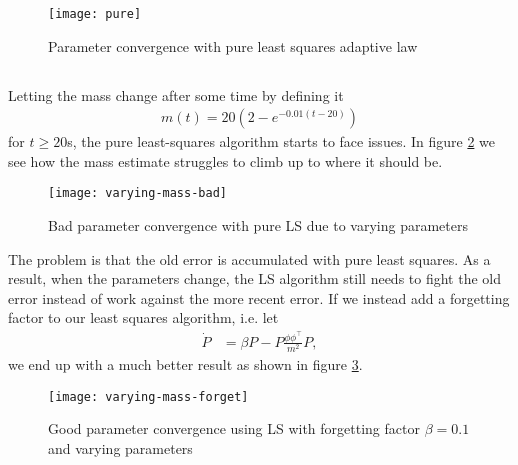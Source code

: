 \documentclass[]{article}
\begin{document}
\begin{figure}[H]
\centering
\texttt{[image: pure]}
\caption{Parameter convergence with pure least squares adaptive law}
\label{fig:pure}
\end{figure}

\subsection{}
Letting the mass change after some time by defining it
\begin{equation}\begin{aligned}
m(t) = 20(2 - e^{-0.01(t-20)})
\end{aligned}\end{equation}
for $t \geq 20$s, the pure least-squares algorithm starts to face issues. In figure \ref{fig:varying-mass-bad} we see how the mass estimate struggles to climb up to where it should be.
\begin{figure}[H]
\centering
\texttt{[image: varying-mass-bad]}
\caption{Bad parameter convergence with pure LS due to varying parameters}
\label{fig:varying-mass-bad}
\end{figure}
The problem is that the old error is accumulated with pure least squares. As a result, when the parameters change, the LS algorithm still needs to fight the old error instead of work against the more recent error. If we instead add a forgetting factor to our least squares algorithm, i.e. let
\begin{equation}\begin{aligned}
\dot P &= \beta P -P \frac{\phi \phi^\top}{m^2}P,
\end{aligned}\end{equation}
we end up with a much better result as shown in figure \ref{fig:varying-mass-forget}.

\begin{figure}[H]
\centering
\texttt{[image: varying-mass-forget]}
\caption{Good parameter convergence using LS with forgetting factor $\beta = 0.1$ and varying parameters}
\label{fig:varying-mass-forget}
\end{figure}
\end{document}
